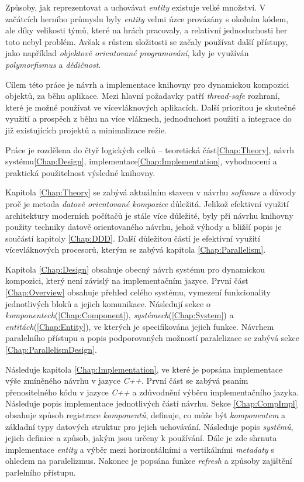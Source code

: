 
\iffalse

Způsoby, jak reprezentovat a uchovávat \emph{entity} existuje velké množství. V začátcích herního průmyslu byly \emph{entity} velmi úzce provázány s okolním kódem, ale díky velikosti týmů, které na hrách pracovaly, a relativní jednoduchosti her toto nebyl problém. Avšak s růstem složitosti se začaly používat další přístupy, jako například \emph{objektově orientované programování}, kdy je využíván \emph{polymorfismus} a \emph{dědičnost}. 

Cílem této práce je návrh a implementace knihovny pro dynamickou kompozici objektů, za běhu aplikace. Mezi hlavní požadavky patří \emph{thread-safe}\cite{ThreadSafety} rozhraní, které je možné používat ve vícevláknových aplikacích. Další prioritou je skutečné využití a prospěch z běhu na více vláknech, jednoduchost použití a integrace do již existujících projektů a minimalizace režie.

Práce je rozdělena do čtyř logických celků -- teoretická část\ref{Chap:Theory}, návrh systému\ref{Chap:Design}, implementace\ref{Chap:Implementation}, vyhodnocení a praktická použitelnost výsledné knihovny.

Kapitola \ref{Chap:Theory} se zabývá aktuálním stavem v návrhu \emph{software} a důvody proč je metoda \emph{datově orientované kompozice} důležitá. Jelikož efektivní využití architektury moderních počítačů je stále více důležité, byly při návrhu knihovny použity techniky datově orientovaného návrhu\cite{DataOrientedDesign}, jehož výhody a bližší popis je součástí kapitoly \ref{Chap:DDD}. Další důležitou částí je efektivní využití vícevláknových procesorů, kterým se zabývá kapitola \ref{Chap:Parallelism}.

Kapitola \ref{Chap:Design} obsahuje obecný návrh systému pro dynamickou kompozici, který není závislý na implementačním jazyce. První část \ref{Chap:Overview} obsahuje přehled celého systému, vymezení funkcionality jednotlivých bloků a jejich komunikace. Následují sekce o \emph{komponentech}(\ref{Chap:Component}), \emph{systémech}(\ref{Chap:System}) a \emph{entitách}(\ref{Chap:Entity}), ve kterých je specifikována jejich funkce. Návrhem paralelního přístupu a popis podporovaných možností paralelizace se zabývá sekce \ref{Chap:ParallelismDesign}.

Následuje kapitola \ref{Chap:Implementation}, ve které je popsána implementace výše zmíněného návrhu v jazyce \emph{C++}. První část se zabývá psaním přenositelného kódu v jazyce \emph{C++} a zdůvodnění výběru implementačního jazyka. Následuje popis implementace jednotlivých částí návrhu. Sekce \ref{Chap:CompImpl} obsahuje způsob registrace \emph{komponentů}, definuje, co může být \emph{komponentem} a základní typy datových struktur pro jejich uchovávání. Následuje popis \emph{systémů}, jejich definice a způsob, jakým jsou určeny k používání. Dále je zde shrnuta implementace \emph{entity} a výběr mezi horizontálními a vertikálními \emph{metadaty} s ohledem na paralelizmus. Nakonec je popsána funkce \emph{refresh} a způsoby zajištění parlelního přístupu.

